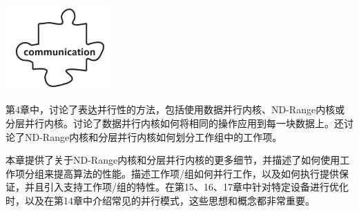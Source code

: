 \begin{center}
	\includegraphics[width=0.3\textwidth]{content/chapter-9/images/1}
\end{center}

第4章中，讨论了表达并行性的方法，包括使用数据并行内核、ND-Range内核或分层并行内核。讨论了数据并行内核如何将相同的操作应用到每一块数据上。还讨论了ND-Range内核和分层并行内核如何划分工作组中的工作项。\par

本章提供了关于ND-Range内核和分层并行内核的更多细节，并描述了如何使用工作项分组来提高算法的性能。描述工作项/组如何并行工作，以及如何执行提供保证，并且引入支持工作项/组的特性。在第15、16、17章中针对特定设备进行优化时，以及在第14章中介绍常见的并行模式，这些思想和概念都非常重要。\par